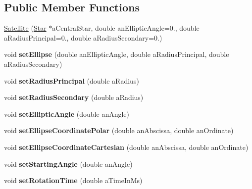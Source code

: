 \subsection*{Public Member Functions}
\begin{DoxyCompactItemize}
\item 
\hyperlink{class_satellite_ae33ea904e7f06940431573b906d19bed}{Satellite} (\hyperlink{class_star}{Star} $\ast$a\-Central\-Star, double an\-Elliptic\-Angle=0., double a\-Radius\-Principal=0., double a\-Radius\-Secondary=0.)
\item 
\hypertarget{class_satellite_a56e6863c13eb8b8e51f1feb4aa7669fd}{void {\bfseries set\-Ellipse} (double an\-Elliptic\-Angle, double a\-Radius\-Principal, double a\-Radius\-Secondary)}\label{class_satellite_a56e6863c13eb8b8e51f1feb4aa7669fd}

\item 
\hypertarget{class_satellite_a645fc4fe6f1af679159b7eaafd6b9185}{void {\bfseries set\-Radius\-Principal} (double a\-Radius)}\label{class_satellite_a645fc4fe6f1af679159b7eaafd6b9185}

\item 
\hypertarget{class_satellite_a2f764b7c81ea8b2379e7cb2bfe7d96a4}{void {\bfseries set\-Radius\-Secondary} (double a\-Radius)}\label{class_satellite_a2f764b7c81ea8b2379e7cb2bfe7d96a4}

\item 
\hypertarget{class_satellite_a96f69209edbe8a2f02fdf56e575ae875}{void {\bfseries set\-Elliptic\-Angle} (double an\-Angle)}\label{class_satellite_a96f69209edbe8a2f02fdf56e575ae875}

\item 
\hypertarget{class_satellite_afc6af0d2d261a63dd2afe415d45cd6aa}{void {\bfseries set\-Ellipse\-Coordinate\-Polar} (double an\-Abscissa, double an\-Ordinate)}\label{class_satellite_afc6af0d2d261a63dd2afe415d45cd6aa}

\item 
\hypertarget{class_satellite_a480e835195981a617f15466fca60fa41}{void {\bfseries set\-Ellipse\-Coordinate\-Cartesian} (double an\-Abscissa, double an\-Ordinate)}\label{class_satellite_a480e835195981a617f15466fca60fa41}

\item 
\hypertarget{class_satellite_a1b2662ee8876c0caf9ff2c59a711a68e}{void {\bfseries set\-Starting\-Angle} (double an\-Angle)}\label{class_satellite_a1b2662ee8876c0caf9ff2c59a711a68e}

\item 
\hypertarget{class_satellite_a25ad437e6ca23e4f889a7add765e74e7}{void {\bfseries set\-Rotation\-Time} (double a\-Time\-In\-Ms)}\label{class_satellite_a25ad437e6ca23e4f889a7add765e74e7}


\end{DoxyCompactItemize}
